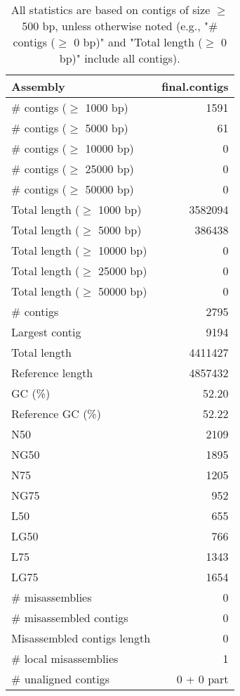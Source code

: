 \documentclass[12pt,a4paper]{article}
\begin{document}
\begin{table}[ht]
\begin{center}
\caption{All statistics are based on contigs of size $\geq$ 500 bp, unless otherwise noted (e.g., "\# contigs ($\geq$ 0 bp)" and "Total length ($\geq$ 0 bp)" include all contigs).}
\begin{tabular}{|l*{1}{|r}|}
\hline
Assembly & final.contigs \\ \hline
\# contigs ($\geq$ 1000 bp) & 1591 \\ \hline
\# contigs ($\geq$ 5000 bp) & 61 \\ \hline
\# contigs ($\geq$ 10000 bp) & 0 \\ \hline
\# contigs ($\geq$ 25000 bp) & 0 \\ \hline
\# contigs ($\geq$ 50000 bp) & 0 \\ \hline
Total length ($\geq$ 1000 bp) & 3582094 \\ \hline
Total length ($\geq$ 5000 bp) & 386438 \\ \hline
Total length ($\geq$ 10000 bp) & 0 \\ \hline
Total length ($\geq$ 25000 bp) & 0 \\ \hline
Total length ($\geq$ 50000 bp) & 0 \\ \hline
\# contigs & 2795 \\ \hline
Largest contig & 9194 \\ \hline
Total length & 4411427 \\ \hline
Reference length & 4857432 \\ \hline
GC (\%) & 52.20 \\ \hline
Reference GC (\%) & 52.22 \\ \hline
N50 & 2109 \\ \hline
NG50 & 1895 \\ \hline
N75 & 1205 \\ \hline
NG75 & 952 \\ \hline
L50 & 655 \\ \hline
LG50 & 766 \\ \hline
L75 & 1343 \\ \hline
LG75 & 1654 \\ \hline
\# misassemblies & 0 \\ \hline
\# misassembled contigs & 0 \\ \hline
Misassembled contigs length & 0 \\ \hline
\# local misassemblies & 1 \\ \hline
\# unaligned contigs & 0 + 0 part \\ \hline

\end{tabular}
\end{center}
\end{table}
\end{document}
